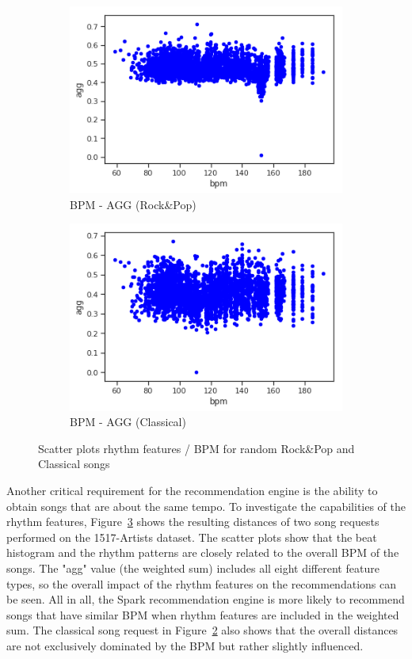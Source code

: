 \begin{figure}[htbp]
{{			\begin{subfigure}{.495\textwidth}
				\centering			
				\includegraphics[scale=0.5]{Images/SparkFeat/bpm_agg_hip.png}	
				\caption{BPM - AGG (Rock\&Pop)}
				\label{fig:arbpm}
			\end{subfigure}		
			\begin{subfigure}{.495\textwidth}
				\centering			
				\includegraphics[scale=0.5]{Images/SparkFeat/bpm_agg_clas.png}	
				\caption{BPM - AGG (Classical)}
				\label{fig:acbpm}
			\end{subfigure}%
	}}
	\caption{Scatter plots rhythm features / BPM for random Rock\&Pop and Classical songs}
	\label{fig:rhythmfeat}
\end{figure}
\FloatBarrier

\noindent Another critical requirement for the recommendation engine is the ability to obtain songs that are about the same tempo. To investigate the capabilities of the rhythm features, Figure~\ref{fig:rhythmfeat} shows the resulting distances of two song requests performed on the 1517-Artists dataset.
\noindent The scatter plots show that the beat histogram and the rhythm patterns are closely related to the overall BPM of the songs. The "agg" value (the weighted sum) includes all eight different feature types, so the overall impact of the rhythm features on the recommendations can be seen. All in all, the Spark recommendation engine is more likely to recommend songs that have similar BPM when rhythm features are included in the weighted sum. The classical song request in Figure~\ref{fig:acbpm} also shows that the overall distances are not exclusively dominated by the BPM but rather slightly influenced. 

